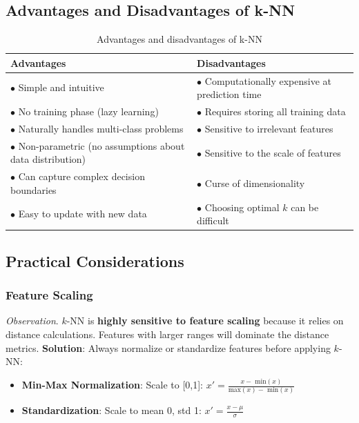 \documentclass[a4paper]{article}
\theoremstyle{definition}
\begin{document}
\subsection{Advantages and Disadvantages of k-NN}
\begin{table}[htbp]
    \centering
    \begin{tabular}{|p{}|p{}|}
        \hline
        \textbf{Advantages} & \textbf{Disadvantages} \\
        \hline
        $\bullet$ Simple and intuitive & $\bullet$ Computationally expensive at prediction time \\
        $\bullet$ No training phase (lazy learning) & $\bullet$ Requires storing all training data \\
        $\bullet$ Naturally handles multi-class problems & $\bullet$ Sensitive to irrelevant features \\
        $\bullet$ Non-parametric (no assumptions about data distribution) & $\bullet$ Sensitive to the scale of features \\
        $\bullet$ Can capture complex decision boundaries & $\bullet$ Curse of dimensionality \\
        $\bullet$ Easy to update with new data & $\bullet$ Choosing optimal $k$ can be difficult \\
        \hline
    \end{tabular}
    \caption{Advantages and disadvantages of k-NN}
    \label{tab:knn-pros-cons}
\end{table}
\subsection{Practical Considerations}
\subsubsection{Feature Scaling}
\textit{Observation}. \( k \)-NN is \textbf{highly sensitive to feature scaling} because it relies on distance calculations. Features with larger ranges 
will dominate the distance metrics.
\vspace{1em}
\noindent
\newline
\textbf{Solution}: Always normalize or standardize features before applying \( k \)-NN:
\begin{itemize}
    \item \textbf{Min-Max Normalization}: Scale to [0,1]: \( x' = \frac{x - \text{ min}(x)}{\text{max}(x) - \text{ min}(x)} \) 
    \item \textbf{Standardization}: Scale to mean 0, std 1: \( x' = \frac{x - \mu}{\sigma} \)
\end{itemize}
\end{document}
